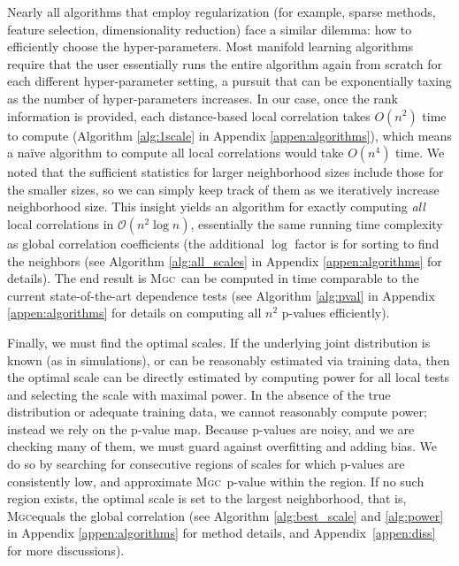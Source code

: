 \documentclass[11pt]{article}
\providecommand{\sct}[1]{{\normalfont\textsc{#1}}}
\providecommand{\mc}[1]{\mathcal{#1}}
\newcommand{\Mgc}{\sct{Mgc}}
\begin{document}
Nearly all algorithms that employ regularization (for example, sparse methods, feature selection, dimensionality reduction) face a similar dilemma: how to efficiently choose the hyper-parameters.
% 
Most manifold learning algorithms require that the user essentially runs the entire algorithm again from scratch for each different hyper-parameter setting, a pursuit that can be exponentially taxing as the number of hyper-parameters increases.
In our case, once the rank information is provided, each distance-based local correlation takes $O(n^2)$ time to compute (Algorithm \ref{alg:1scale} in Appendix \ref{appen:algorithms}), which means a na\"ive algorithm to compute all local correlations would take $O(n^4)$ time.
% 
We noted that the sufficient statistics for larger neighborhood sizes include those for the smaller sizes, so we can simply keep track of them as we iteratively increase neighborhood size. 
This insight yields an algorithm for exactly computing \emph{all} local correlations in $\mc{O}(n^2 \log n)$, essentially the same running time complexity as  global correlation coefficients (the additional $\log$ factor is for sorting to find the neighbors  (see Algorithm \ref{alg:all_scales} in Appendix \ref{appen:algorithms} for details). 
The end result is \Mgc~can be computed in  time comparable to the current state-of-the-art dependence tests (see Algorithm \ref{alg:pval} in Appendix \ref{appen:algorithms} for details on computing all $n^2$ p-values efficiently).
% 

Finally, we must find the optimal scales. If the underlying joint distribution is known (as in simulations), or can be reasonably estimated via training data, then the optimal scale can be directly estimated by computing power for all local tests and selecting the scale with maximal power. In the absence of the true distribution or adequate training data, we cannot reasonably compute power; instead we rely on the p-value map.  Because p-values are noisy, and we are checking many of them, we must guard against overfitting and adding bias.  We do so by searching for consecutive regions of scales for which p-values are consistently low, and approximate \Mgc~p-value within the region. If no such region exists, the optimal scale is set to the largest neighborhood, that is, \Mgc equals the global correlation
(see Algorithm \ref{alg:best_scale} and \ref{alg:power} in Appendix \ref{appen:algorithms} for method details, and Appendix~\ref{appen:diss} for more discussions).
\end{document}
